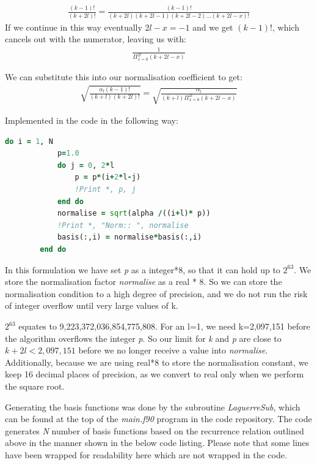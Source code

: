 \documentclass{article}
\begin{document}
    \begin{gather}
    	\frac{(k-1)!}{(k+2l)!} = \frac{(k-1)!}{(k+2l)(k+2l-1)(k+2l-2)...(k+2l-x)!}
    \end{gather}
    If we continue in this way eventually $2l-x=-1$ and we get $(k-1)!$, which cancels out with the numerator, leaving us with:
    \begin{gather}
    	\frac{1}{\Pi_{x=0}^{2l}(k+2l-x)}
    \end{gather}
    
    We can substitute this into our normalisation coefficient to get:
    \begin{gather}
    	\sqrt{\frac{\alpha_l (k-1)!}{(k+l)(k+2l)!}} = \sqrt{\frac{\alpha_l}{(k+l)\Pi_{x=0}^{2l}(k+2l-x)}}
    \end{gather}
    
    Implemented in the code in the following way:
    \begin{lstlisting}[language=Fortran]
    	do i = 1, N
    		p=1.0
	    	do j = 0, 2*l
	    		p = p*(i+2*l-j)
	    		!Print *, p, j
	    	end do
	    	normalise = sqrt(alpha /((i+l)* p))
	    	!Print *, "Norm:: ", normalise
	    	basis(:,i) = normalise*basis(:,i)
    	end do
    \end{lstlisting}
    
    In this formulation we have set \textit{p} as a integer*8, so that it can hold up to $2^{63}$. We store the normalisation factor \textit{normalise} as a real * 8. So we can store the normalisation condition to a high degree of precision, and we do not run the risk of integer overflow until very large values of k. 
    
    $2^{63}$ equates to 9,223,372,036,854,775,808. For an l=1, we need k=2,097,151 before the algorithm overflows the integer \textit{p}. So our limit for \textit{k} and \textit{p} are close to $k+2l < 2,097,151$ before we no longer receive a value into \textit{normalise}. Additionally, because we are using real*8 to store the normalisation constant, we keep 16 decimal places of precision, as we convert to real only when we perform the square root.
    
    Generating the basis functions was done by the subroutine \textit{LaguerreSub}, which can be found at the top of the \textit{main.f90} program in the code repository. The code generates \textit{N} number of basis functions based on the recurrence relation outlined above in the manner shown in the below code listing. Please note that some lines have been wrapped for readability here which are not wrapped in the code.
    
\end{document}
